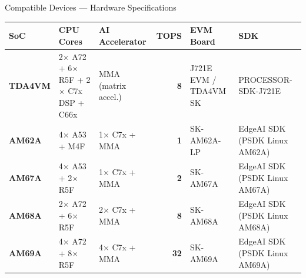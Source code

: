 \documentclass[aspectratio=169,12pt]{beamer}
\begin{document}
\begin{frame}{Compatible Devices --- Hardware Specifications}
  \centering
  \scriptsize
  \begin{tabular}{p{1.4cm}p{2.8cm}p{2.2cm}rp{2.0cm}p{2.2cm}}
    \toprule
    \textbf{SoC} & \textbf{CPU Cores} & \textbf{AI Accelerator} & \textbf{TOPS} & \textbf{EVM Board} & \textbf{SDK} \\
    \midrule
    \rowcolor{TIRed!15}
    \textbf{\textcolor{TIRed}{TDA4VM}} &
      2$\times$ A72 + 6$\times$ R5F + 2$\times$ C7x DSP + C66x &
      MMA (matrix accel.) & \textbf{8} &
      J721E EVM / TDA4VM SK &
      PROCESSOR-SDK-J721E \\[3pt]

    \rowcolor{TIBlue!10}
    \textbf{\textcolor{TIBlue}{AM62A}} &
      4$\times$ A53 + M4F &
      1$\times$ C7x + MMA & \textbf{1} &
      SK-AM62A-LP &
      EdgeAI SDK (PSDK Linux AM62A) \\[3pt]

    \rowcolor{TIBlue!18}
    \textbf{\textcolor{TIBlue!80}{AM67A}} &
      4$\times$ A53 + 2$\times$ R5F &
      1$\times$ C7x + MMA & \textbf{2} &
      SK-AM67A &
      EdgeAI SDK (PSDK Linux AM67A) \\[3pt]

    \rowcolor{TIGreen!12}
    \textbf{\textcolor{TIGreen}{AM68A}} &
      2$\times$ A72 + 6$\times$ R5F &
      2$\times$ C7x + MMA & \textbf{8} &
      SK-AM68A &
      EdgeAI SDK (PSDK Linux AM68A) \\[3pt]

    \rowcolor{TIOrange!12}
    \textbf{\textcolor{TIOrange}{AM69A}} &
      4$\times$ A72 + 8$\times$ R5F &
      4$\times$ C7x + MMA & \textbf{32} &
      SK-AM69A &
      EdgeAI SDK (PSDK Linux AM69A) \\
    \bottomrule
  \end{tabular}


\end{frame}
\end{document}
